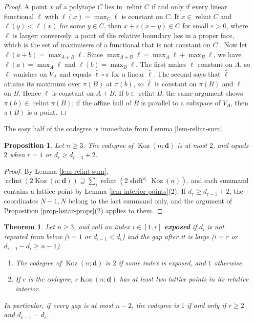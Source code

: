 \documentclass[11pt, a4paper, abstract=yes]{scrartcl}
\theoremstyle{definition}
\theoremstyle{remark}
\theoremstyle{plain}
\newtheorem{proposition}[definition]{Proposition}
\newtheorem{theorem}[definition]{Theorem}
\newcommand{\vek}[1]{\boldsymbol{#1}}
\theoremstyle{remark}
\theoremstyle{plain}
\newcommand{\Koz}{\operatorname{Koz}}
\newcommand{\shift}{\operatorname{shift}}
\newcommand{\relint}{\operatorname{relint}}
\newcommand{\leannone}{\tikz[baseline=-0.6ex]\draw[leannone,line width=0.6pt] (0,0) circle (0.55ex);}
\newcommand{\leanmark}[1]{\leavevmode{\reversemarginpar\marginnote{\raggedleft#1}}}
\begin{document}
\begin{proof}
A point \(x\) of a polytope \(C\) lies in \(\relint C\) if and only if every linear functional \(\ell\) with
\(\ell(x)=\max_C\ell\) is constant on \(C\). If \(x\in\relint C\) and \(\ell(y)<\ell(x)\) for some \(y\in C\),
then \(x+\varepsilon(x-y)\in C\) for small \(\varepsilon>0\), where \(\ell\) is larger; conversely, a point of
the relative boundary lies in a proper face, which is the set of maximisers of a functional that is
not constant on \(C\) \autocite[Chapter 2]{Ziegler1995}. Now let \(\ell(a+b)=\max_{A+B}\ell\). Since
\(\max_{A+B}\ell=\max_A\ell+\max_B\ell\), we have \(\ell(a)=\max_A\ell\) and \(\ell(b)=\max_B\ell\). The first
makes \(\ell\) constant on \(A\), so \(\ell\) vanishes on \(V_A\) and equals \(\bar\ell\circ\pi\) for a linear
\(\bar\ell\). The second says that \(\bar\ell\) attains its maximum over \(\pi(B)\) at \(\pi(b)\), so
\(\bar\ell\) is constant on \(\pi(B)\) and \(\ell\) on \(B\). Hence \(\ell\) is constant on \(A+B\). If
\(b\in\relint B\), the same argument shows \(\pi(b)\in\relint\pi(B)\); if the affine hull of \(B\) is
parallel to a subspace of \(V_A\), then \(\pi(B)\) is a point.
\end{proof}

The easy half of the codegree is immediate from Lemma \ref{lem-relint-sum}.

\begin{proposition}
\leanmark{\leannone}Let \(n\ge3\). The codegree of \(\Koz(n;\vek d)\) is at most \(2\), and equals \(2\) when \(r=1\) or
\(d_r\ge d_{r-1}+2\).
\label{prop-codegree}
\end{proposition}

\begin{proof}
By Lemma \ref{lem-relint-sum}, \(\relint(2\Koz(n;\vek d))\supseteq\sum_i\relint(2\shift^{d_i}\Koz(n))\), and
each summand contains a lattice point by Lemma \ref{lem-interior-points}(2). If \(d_r\ge d_{r-1}+2\), the coordinates \(N-1,N\) belong
to the last summand only, and the argument of Proposition \ref{prop-hstar-props}(2) applies to them.
\end{proof}

\begin{theorem}
\leanmark{\leannone}Let \(n\ge3\), and call an index \(i\in[1,r]\) \textbf{exposed} if \(d_i\) is not repeated from below
(\(i=1\) or \(d_{i-1}<d_i\)) and the gap after it is large (\(i=r\) or \(d_{i+1}-d_i\ge n-1\)).
\begin{enumerate}
\item The codegree of \(\Koz(n;\vek d)\) is \(2\) if some index is exposed, and \(1\) otherwise.
\item If \(c\) is the codegree, \(c\Koz(n;\vek d)\) has at least two lattice points in its relative
interior.
\end{enumerate}
In particular, if every gap is at most \(n-2\), the codegree is \(1\) if and only if \(r\ge2\) and
\(d_{r-1}=d_r\).
\label{thm-codegree}
\end{theorem}
\end{document}
